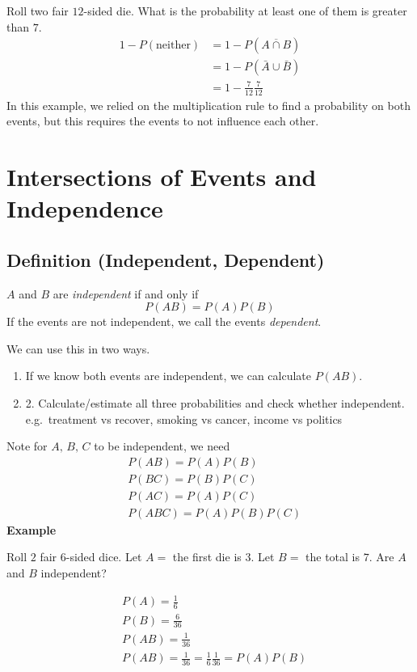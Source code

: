 Roll two fair $ 12 $-sided die. What is the probability at least one of them
is greater than $ 7 $.
\begin{align*}
    1-P(\text{neither}) & =1-P(\overline{A\cap B})    \\
                        & =1-P(\bar{A}\cup \bar{B})   \\
                        & =1-\frac{7}{12}\frac{7}{12}
\end{align*}
In this example, we relied on the multiplication rule to find a probability
on both events, but this requires the events to not influence each other.

\section{Intersections of Events and Independence}

\begin{defbox}
    \subsection{Definition (Independent, Dependent)}
    $ A $ and $ B $ are \emph{independent} if and only if
    \[ P(AB) =P(A)P(B)\]
    If the events are not independent, we call the events \emph{dependent}.
\end{defbox}
We can use this in two ways.

\begin{enumerate}
    \item If we know both events are independent, we can calculate $ P(AB) $.
    \item 2. Calculate/estimate all three probabilities and check whether independent.
          e.g.\ treatment vs recover, smoking vs cancer, income vs politics
\end{enumerate}

Note for $ A,\,B,\,C $ to be independent, we need
\begin{align*}
     & P(AB)=P(A)P(B)      \\
     & P(BC)=P(B)P(C)      \\
     & P(AC)=P(A)P(C)      \\
     & P(ABC)=P(A)P(B)P(C)
\end{align*}
\textbf{Example}

Roll $ 2 $ fair $ 6 $-sided dice. Let $ A=$ the first die is $ 3 $. Let
$ B= $ the total is $ 7 $. Are $ A $ and $ B $ independent?

\begin{align*}
     & P(A)=\frac{1}{6}                                     \\
     & P(B)=\frac{6}{36}                                    \\
     & P(AB)=\frac{1}{36}                                   \\
     & P(AB)=\frac{1}{36}=\frac{1}{6} \frac{1}{36}=P(A)P(B)
\end{align*}

